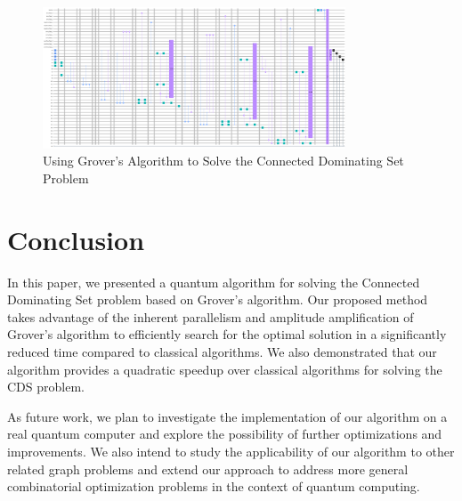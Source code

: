 \begin{figure}[htp]
    \centering
    \includegraphics[width=9cm]{Figures/Connected_Dominating_Set_circuit.png}
    \caption{Using Grover's Algorithm to Solve the Connected Dominating Set Problem}
    \label{fig:Connected_Dominating_Set}
\end{figure}

\section{Conclusion}
\label{sec:conclusion}

In this paper, we presented a quantum algorithm for solving the Connected Dominating Set problem based on Grover's algorithm. Our proposed method takes advantage of the inherent parallelism and amplitude amplification of Grover's algorithm to efficiently search for the optimal solution in a significantly reduced time compared to classical algorithms. We also demonstrated that our algorithm provides a quadratic speedup over classical algorithms for solving the CDS problem.

As future work, we plan to investigate the implementation of our algorithm on a real quantum computer and explore the possibility of further optimizations and improvements. We also intend to study the applicability of our algorithm to other related graph problems and extend our approach to address more general combinatorial optimization problems in the context of quantum computing.

